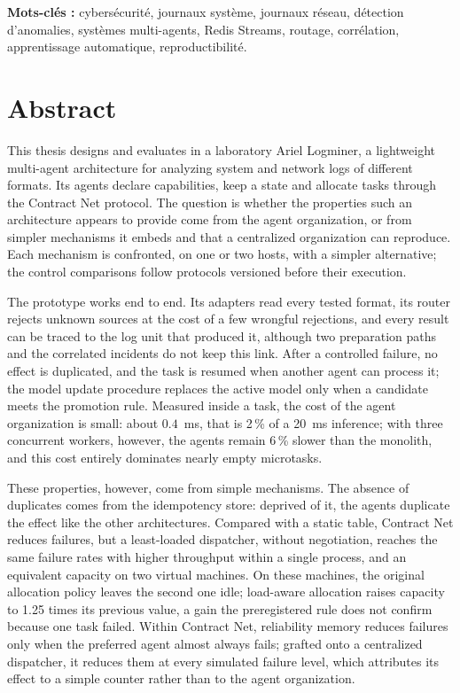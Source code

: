 \documentclass[12pt,a4paper,oneside]{report}
\newcommand{\logminer}{Logminer}
\begin{document}
\bigskip

\noindent
\textbf{Mots-clés :}
cybersécurité, journaux système, journaux réseau, détection d'anomalies,
systèmes multi-agents, Redis Streams, routage, corrélation, apprentissage
automatique, reproductibilité.


\chapter*{Abstract}

This thesis designs and evaluates in a laboratory Ariel \logminer{}, a lightweight multi-agent architecture for analyzing system and network logs of different formats. Its agents declare capabilities, keep a state and allocate tasks through the Contract Net protocol. The question is whether the properties such an architecture appears to provide come from the agent organization, or from simpler mechanisms it embeds and that a centralized organization can reproduce. Each mechanism is confronted, on one or two hosts, with a simpler alternative; the control comparisons follow protocols versioned before their execution.

The prototype works end to end. Its adapters read every tested format, its router rejects unknown sources at the cost of a few wrongful rejections, and every result can be traced to the log unit that produced it, although two preparation paths and the correlated incidents do not keep this link. After a controlled failure, no effect is duplicated, and the task is resumed when another agent can process it; the model update procedure replaces the active model only when a candidate meets the promotion rule. Measured inside a task, the cost of the agent organization is small: about $0.4$~ms, that is 2\,\% of a 20~ms inference; with three concurrent workers, however, the agents remain 6\,\% slower than the monolith, and this cost entirely dominates nearly empty microtasks.

These properties, however, come from simple mechanisms. The absence of duplicates comes from the idempotency store: deprived of it, the agents duplicate the effect like the other architectures. Compared with a static table, Contract Net reduces failures, but a least-loaded dispatcher, without negotiation, reaches the same failure rates with higher throughput within a single process, and an equivalent capacity on two virtual machines. On these machines, the original allocation policy leaves the second one idle; load-aware allocation raises capacity to 1.25 times its previous value, a gain the preregistered rule does not confirm because one task failed. Within Contract Net, reliability memory reduces failures only when the preferred agent almost always fails; grafted onto a centralized dispatcher, it reduces them at every simulated failure level, which attributes its effect to a simple counter rather than to the agent organization.
\end{document}
